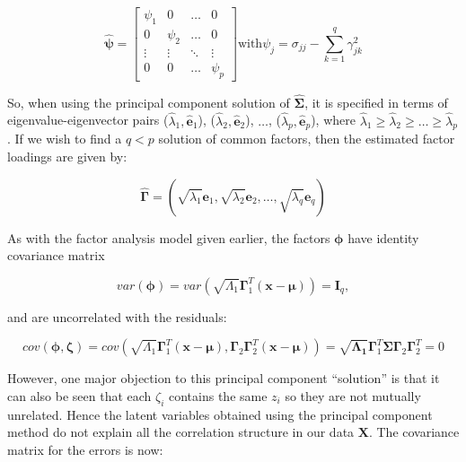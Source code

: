 \begin{equation}
\boldsymbol{\hat{\psi}} = 
\left[ \begin{array}{rrrr} \psi_{1} & 0 & \hdots & 0\\
0 & \psi_{2} & \hdots & 0\\
\vdots & \vdots & \ddots & \vdots\\
0 & 0 & \hdots & \psi_{p}
\end{array} \right]
\mbox{with}  \psi_{j} = \sigma_{jj} - \sum_{k=1}^{q} \gamma_{jk}^{2}
\end{equation}



So, when using the principal component solution of $\boldsymbol{\hat{\Sigma}}$, it is specified in terms of eigenvalue-eigenvector pairs ($\hat{\lambda}_{1}, \hat{\boldsymbol{e}}_{1}$), ($\hat{\lambda}_{2}, \hat{\boldsymbol{e}}_{2}$), $\ldots$, ($\hat{\lambda}_{p}, \hat{\boldsymbol{e}}_{p}$), where $\hat{\lambda}_{1} \geq \hat{\lambda}_{2} \geq \ldots \geq \hat{\lambda}_{p}$.   If we wish to find a $q<p$ solution of common factors, then the estimated factor loadings are given by:

\begin{displaymath}
\boldsymbol{\hat{\Gamma}} = \left( \sqrt{\lambda_{1}} \boldsymbol{e}_{1}, \sqrt{\lambda_{2}} \boldsymbol{e}_{2}, \ldots, \sqrt{\lambda_{q}} \boldsymbol{e}_{q} \right) 
\end{displaymath}

As with the factor analysis model given earlier, the factors $\boldsymbol{\phi}$ have identity covariance matrix

\begin{displaymath}
var(\boldsymbol{\phi}) = var \left(\sqrt{\Lambda_{1}} \boldsymbol{\Gamma}_{1}^{T}(\boldsymbol{x} - \boldsymbol{\mu}) \right) = \boldsymbol{I}_{q},
\end{displaymath}

 and are uncorrelated with the residuals:

\begin{displaymath}
cov(\boldsymbol{\phi}, \boldsymbol{\zeta}) = cov \left( \sqrt{\Lambda_{1}} \boldsymbol{\Gamma}_{1}^{T}(\boldsymbol{x} - \boldsymbol{\mu}),  \boldsymbol{\Gamma}_{2}\boldsymbol{\Gamma}_{2}^{T}(\boldsymbol{x} - \boldsymbol{\mu}) \right) = \sqrt{\boldsymbol{\Lambda_{1}}} \boldsymbol{\Gamma}_{1}^{T} \boldsymbol{\Sigma} \boldsymbol{\Gamma}_{2} \boldsymbol{\Gamma}_{2}^{T} = 0
\end{displaymath}

However, one major objection to this principal component ``solution'' is that it can also be seen that each $\zeta_{i}$ contains the same $z_{i}$ so they are not mutually unrelated.   Hence the latent variables obtained using the principal component method do not explain all the correlation structure in our data $\boldsymbol{X}$.   The covariance matrix for the errors is now:

